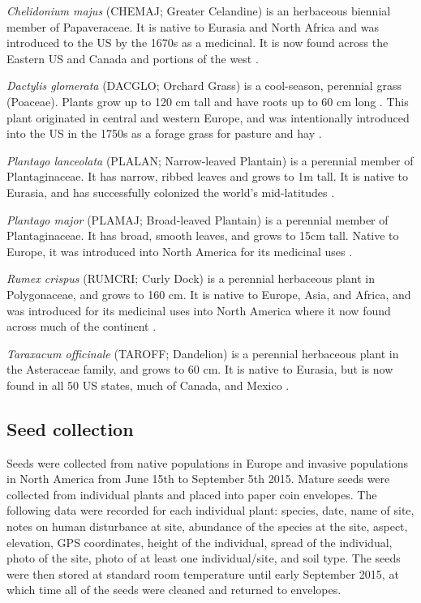 \documentclass[12pt]{article}\usepackage[]{graphicx}\usepackage[]{color}
\begin{document}
	\textit{Chelidonium majus} (CHEMAJ; Greater Celandine) is an herbaceous biennial member of Papaveraceae. It is native to Eurasia and North Africa and was introduced to the US by the 1670s as a medicinal. It is now found across the Eastern US and Canada and portions of the west \parencite{Holm1979}. 
	
	\textit{Dactylis glomerata} (DACGLO; Orchard Grass) is a cool-season, perennial grass (Poaceae). Plants grow up to 120 cm tall and have roots up to 60 cm long \parencite{Moser1996}. This plant originated in central and western Europe, and was intentionally introduced into the US in the 1750s \parencite{Bush2012} as a forage grass for pasture and hay \parencite{Ogle2011}.  
	
	\textit{Plantago lanceolata} (PLALAN; Narrow-leaved Plantain) is a perennial member of  Plantaginaceae. It has narrow, ribbed leaves and grows to 1m tall. It is native to Eurasia, and has successfully colonized the world’s mid-latitudes \parencite{Holm1977}.
	
	\textit{Plantago major} (PLAMAJ; Broad-leaved Plantain) is a perennial member of Plantaginaceae. It has broad, smooth leaves, and grows to 15cm tall. Native to Europe, it was introduced into North America for its medicinal uses \parencite{Knobloch1996,Samuelsen2000}.
	
	\textit{Rumex crispus} (RUMCRI; Curly Dock) is a perennial herbaceous plant in Polygonaceae, and grows to 160 cm. It is native to Europe, Asia, and Africa, and was introduced for its medicinal uses into North America where it now found across much of the continent \parencite{USDA2010}. 
	
	\textit{Taraxacum officinale} (TAROFF; Dandelion) is a perennial herbaceous plant in the Asteraceae family, and grows to 60 cm. It is native to Eurasia, but is now found in all 50 US states, much of Canada, and Mexico \parencite{USDA1971}.
	
	\subsection{Seed collection}
	Seeds were collected from native populations in Europe and invasive populations in North America from June 15th to September 5th 2015. Mature seeds were collected from individual plants and placed into paper coin envelopes. The following data were recorded for each individual plant: species, date, name of site, notes on human disturbance at site, abundance of the species at the site, aspect, elevation, GPS coordinates, height of the individual, spread of the individual, photo of the site, photo of at least one individual/site, and soil type. The seeds were then stored at standard room temperature until early September 2015, at which time all of the seeds were cleaned and returned to envelopes. 
\end{document}
